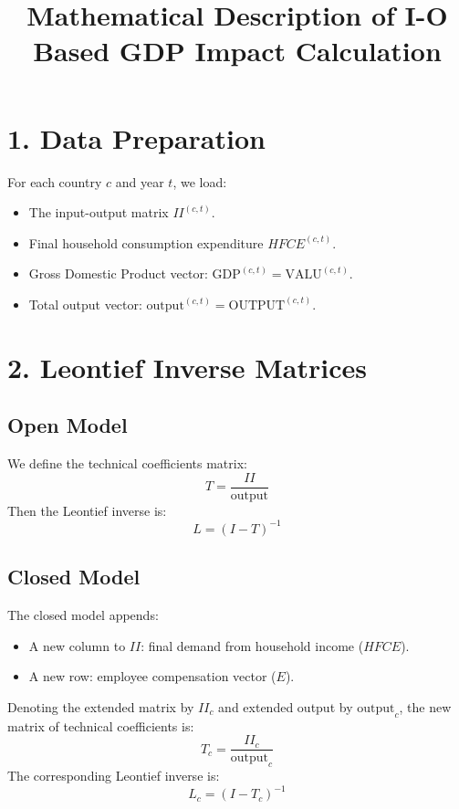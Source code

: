 \documentclass{article}
\title{Mathematical Description of I-O Based GDP Impact Calculation}
\author{}
\date{}
\begin{document}
\maketitle

\section*{1. Data Preparation}

For each country $c$ and year $t$, we load:
\begin{itemize}
  \item The input-output matrix $II^{(c,t)}$.
  \item Final household consumption expenditure $HFCE^{(c,t)}$.
  \item Gross Domestic Product vector: $\text{GDP}^{(c,t)} = \text{VALU}^{(c,t)}$.
  \item Total output vector: $\text{output}^{(c,t)} = \text{OUTPUT}^{(c,t)}$.
\end{itemize}

\section*{2. Leontief Inverse Matrices}

\subsection*{Open Model}

We define the technical coefficients matrix:
\[
T = \frac{II}{\text{output}}
\]
Then the Leontief inverse is:
\[
L = (I - T)^{-1}
\]

\subsection*{Closed Model}

The closed model appends:
\begin{itemize}
  \item A new column to $II$: final demand from household income ($HFCE$).
  \item A new row: employee compensation vector ($E$).
\end{itemize}

Denoting the extended matrix by $II_c$ and extended output by $\text{output}_c$, the new matrix of technical coefficients is:
\[
T_c = \frac{II_c}{\text{output}_c}
\]
The corresponding Leontief inverse is:
\[
L_c = (I - T_c)^{-1}
\]
\end{document}
